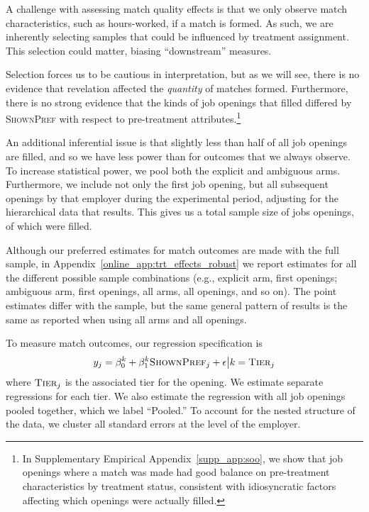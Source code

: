 \documentclass[12pt]{article}
\makeatletter
\renewcommand{\subsection}{%
  \@startsection{subsection}{2}{\z@}%
  {-3.25ex plus -1ex minus -.2ex}%
  {1.5ex plus .2ex}%
  {\normalfont\large\bfseries}%
}
\makeatother
\begin{document}

A challenge with assessing match quality effects is that we only observe match characteristics, such as hours-worked, if a match is formed.
As such, we are inherently selecting samples that could be influenced by treatment assignment.
This selection could matter, biasing ``downstream'' measures.  

Selection forces us to be cautious in interpretation, but as we will see, there is no evidence that revelation affected the \emph{quantity} of matches formed.
Furthermore, there is no strong evidence that the kinds of job openings that filled differed by \textsc{ShownPref} with respect to pre-treatment attributes.\footnote{In Supplementary Empirical Appendix~\ref{supp_app:soo}, we show that job openings where a match was made had good balance on pre-treatment characteristics by treatment status, consistent with idiosyncratic factors affecting which openings were actually filled.}

An additional inferential issue is that slightly less than half of all job openings are filled, and so we have less power than for outcomes that we always observe.
To increase statistical power, we pool both the explicit and ambiguous arms.
Furthermore, we include not only the first job opening, but all subsequent openings by that employer during the experimental period, adjusting for the hierarchical data that results.
This gives us a total sample size of \TotalSampleSize{} jobs openings, of which  \TotalFilledSampleSize{} were filled. 

Although our preferred estimates for match outcomes are made with the full sample, in Appendix~\ref{online_app:trt_effects_robust} we report estimates for all the different possible sample combinations (e.g., explicit arm, first openings; ambiguous arm, first openings, all arms, all openings, and so on).
The point estimates differ with the sample, but the same general pattern of results is the same as reported when using all arms and all openings. 

To measure match outcomes, our regression specification is 
\begin{align} \label{eq:match_outcomes}
  y_j = \beta^k_0 + \beta^k_1 \textsc{ShownPref}_j + \epsilon  \big| k = \textsc{Tier}_{j}
\end{align}
where $\textsc{Tier}_{j}$ is the associated tier for the opening. 
We estimate separate regressions for each tier.
We also estimate the regression with all job openings pooled together, which we label ``Pooled.'' 
To account for the nested structure of the data, we cluster all standard errors at the level of the employer. 
\end{document}
